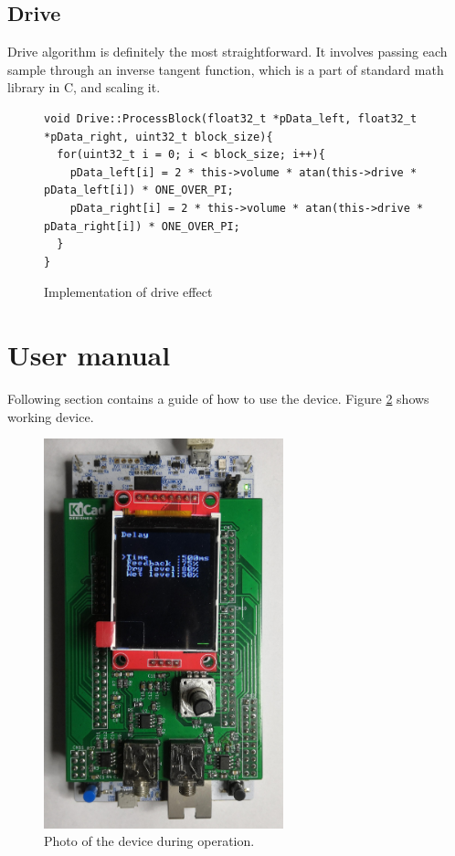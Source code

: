 \documentclass[a4paper,twoside,12pt]{book}
\begin{document}
\subsection{Drive}
Drive algorithm is definitely the most straightforward.
It involves passing each sample through an inverse tangent function,
which is a part of standard math library in C, and scaling it.

\begin{figure}[H]
\centering
\begin{lstlisting}
void Drive::ProcessBlock(float32_t *pData_left, float32_t *pData_right, uint32_t block_size){
  for(uint32_t i = 0; i < block_size; i++){
    pData_left[i] = 2 * this->volume * atan(this->drive * pData_left[i]) * ONE_OVER_PI;
    pData_right[i] = 2 * this->volume * atan(this->drive * pData_right[i]) * ONE_OVER_PI;
  }
}
\end{lstlisting}
\caption{Implementation of drive effect}
\label{fig:Drv}
\end{figure}


\section{User manual}\label{ch:manual}
Following section contains a guide of
how to use the device.
Figure \ref{fig:working} shows working device.

\begin{figure}[H]
    \centering
    \includegraphics[angle=90,width=0.618\textwidth]{images/photo_working}
    \caption{Photo of the device during operation.}
    \label{fig:working}
\end{figure}
\end{document}
